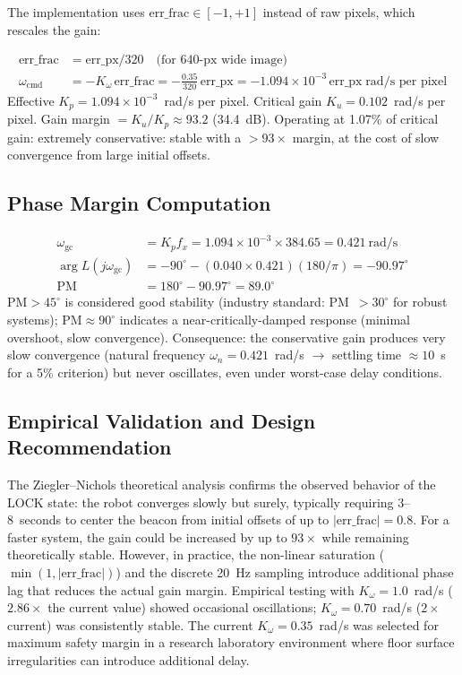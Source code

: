 The implementation uses $\text{err\_frac}\in[-1,+1]$ instead of raw pixels, which rescales the gain:

\begin{eqblock}
\begin{align}
\text{err\_frac} &= \text{err\_px}/320 \quad \text{(for 640-px wide image)} \\
\omega_{\text{cmd}} &= -K_\omega\,\text{err\_frac} = -\frac{0.35}{320}\,\text{err\_px} = -1.094\times10^{-3}\,\text{err\_px} \; \text{rad/s per pixel}
\end{align}
Effective $K_p = 1.094\times10^{-3}$~rad/s per pixel. Critical gain $K_u = 0.102$~rad/s per pixel. Gain margin $= K_u/K_p \approx 93.2$ (34.4~dB). Operating at 1.07\% of critical gain: extremely conservative: stable with a $>93\times$ margin, at the cost of slow convergence from large initial offsets.
\end{eqblock}

\subsection{Phase Margin Computation}

\begin{eqblock}
\begin{align}
\omega_{\text{gc}} &= K_p f_x = 1.094\times10^{-3}\times384.65 = 0.421~\text{rad/s} \\
\arg L(j\omega_{\text{gc}}) &= -90^\circ - (0.040\times0.421)(180/\pi) = -90.97^\circ \\
\text{PM} &= 180^\circ - 90.97^\circ = 89.0^\circ
\end{align}
$\text{PM}>45^\circ$ is considered good stability (industry standard: PM~$>30^\circ$ for robust systems); $\text{PM}\approx90^\circ$ indicates a near-critically-damped response (minimal overshoot, slow convergence). Consequence: the conservative gain produces very slow convergence (natural frequency $\omega_n=0.421$~rad/s $\to$ settling time $\approx10$~s for a 5\% criterion) but never oscillates, even under worst-case delay conditions.
\end{eqblock}

\subsection{Empirical Validation and Design Recommendation}

The Ziegler--Nichols theoretical analysis confirms the observed behavior of the LOCK state: the robot converges slowly but surely, typically requiring 3--8~seconds to center the beacon from initial offsets of up to $|\text{err\_frac}|=0.8$. For a faster system, the gain could be increased by up to $93\times$ while remaining theoretically stable. However, in practice, the non-linear saturation ($\min(1,|\text{err\_frac}|)$) and the discrete 20~Hz sampling introduce additional phase lag that reduces the actual gain margin. Empirical testing with $K_\omega=1.0$~rad/s ($2.86\times$ the current value) showed occasional oscillations; $K_\omega=0.70$~rad/s ($2\times$ current) was consistently stable. The current $K_\omega=0.35$~rad/s was selected for maximum safety margin in a research laboratory environment where floor surface irregularities can introduce additional delay.

